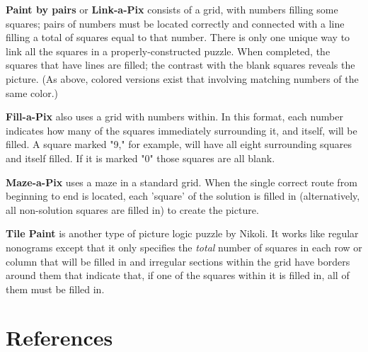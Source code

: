 \textbf{Paint by pairs} or \textbf{Link-a-Pix} consists of a grid, with numbers filling some squares; pairs of numbers must be located correctly and connected with a line filling a total of squares equal to that number.  There is only one unique way to link all the squares in a properly-constructed puzzle.  When completed, the squares that have lines are filled; the contrast with the blank squares reveals the picture. (As above, colored versions exist that involving matching numbers of the same color.)

\textbf{Fill-a-Pix} also uses a grid with numbers within. In this format, each number indicates how many of the squares immediately surrounding it, and itself, will be filled. A square marked "9," for example, will have all eight surrounding squares and itself filled. If it is marked "0" those squares are all blank.

\textbf{Maze-a-Pix} uses a maze in a standard grid.  When the single correct route from beginning to end is located, each 'square' of the solution is filled in (alternatively, all non-solution squares are filled in) to create the picture.

\textbf{Tile Paint} is another type of picture logic puzzle by Nikoli. It works like regular nonograms except that it only specifies the \textit{total} number of squares in each row or column that will be filled in and irregular sections within the grid have borders around them that indicate that, if one of the squares within it is filled in, all of them must be filled in.


\chapter{References}


